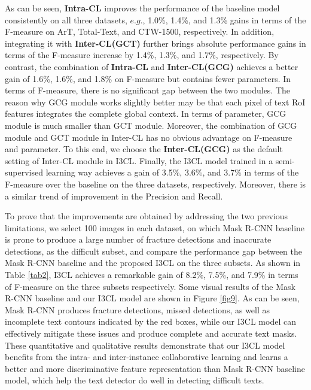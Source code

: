 As can be seen, \textbf{Intra-CL} improves the performance of the baseline model consistently on all three datasets, $e.g.$, 1.0\%, 1.4\%, and 1.3\% gains in terms of the F-measure on ArT, Total-Text, and CTW-1500, respectively. In addition, integrating it with \textbf{Inter-CL(GCT)} further brings absolute performance gains in terms of the F-measure increase by 1.4\%, 1.3\%, and 1.7\%, respectively. By contrast, the combination of \textbf{Intra-CL} and \textbf{Inter-CL(GCG)} achieves a better gain of 1.6\%, 1.6\%, and 1.8\% on F-measure but contains fewer parameters. In terms of F-measure, there is no significant gap between the two modules. The reason why GCG module works slightly better may be that each pixel of text RoI features integrates the complete global context. In terms of parameter, GCG module is much smaller than GCT module. Moreover, the combination of GCG module and GCT module in Inter-CL has no obvious advantage on F-measure and parameter. To this end, we choose the \textbf{Inter-CL(GCG)} as the default setting of Inter-CL module in I3CL. Finally, the I3CL model trained in a semi-supervised learning way achieves a gain of 3.5\%, 3.6\%, and 3.7\% in terms of the F-measure over the baseline on the three datasets, respectively. Moreover, there is a similar trend of improvement in the Precision and Recall. 

To prove that the improvements are obtained by addressing the two previous limitations, we select 100 images in each dataset, on which Mask R-CNN baseline is prone to produce a large number of fracture detections and inaccurate detections, as the difficult subset, and compare the performance gap between the Mask R-CNN baseline and the proposed I3CL on the three subsets. As shown in Table \ref{tab2}, I3CL achieves a remarkable gain of 8.2\%, 7.5\%, and 7.9\% in terms of F-measure on the three subsets respectively. Some visual results of the Mask R-CNN baseline and our I3CL model are shown in Figure \ref{fig9}. As can be seen, Mask R-CNN produces fracture detections, missed detections, as well as incomplete text contours indicated by the red boxes, while our I3CL model can effectively mitigate these issues and produce complete and accurate text masks. These quantitative and qualitative results demonstrate that our I3CL model benefits from the intra- and inter-instance collaborative learning and learns a better and more discriminative feature representation than Mask R-CNN baseline model, which help the text detector do well in detecting difficult texts.

